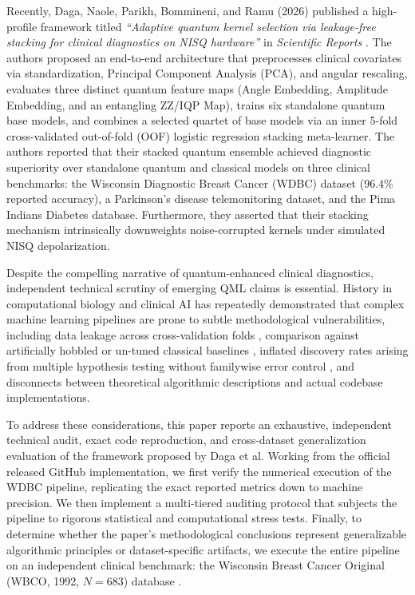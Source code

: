 \documentclass[journal,twocolumn]{IEEEtran}
\begin{document}
Recently, Daga, Naole, Parikh, Bommineni, and Ramu (2026) published a high-profile framework titled \textit{``Adaptive quantum kernel selection via leakage-free stacking for clinical diagnostics on NISQ hardware''} in \textit{Scientific Reports} \cite{daga2026adaptive}. The authors proposed an end-to-end architecture that preprocesses clinical covariates via standardization, Principal Component Analysis (PCA), and angular rescaling, evaluates three distinct quantum feature maps (Angle Embedding, Amplitude Embedding, and an entangling ZZ/IQP Map), trains six standalone quantum base models, and combines a selected quartet of base models via an inner 5-fold cross-validated out-of-fold (OOF) logistic regression stacking meta-learner. The authors reported that their stacked quantum ensemble achieved diagnostic superiority over standalone quantum and classical models on three clinical benchmarks: the Wisconsin Diagnostic Breast Cancer (WDBC) dataset ($96.4\%$ reported accuracy), a Parkinson's disease telemonitoring dataset, and the Pima Indians Diabetes database. Furthermore, they asserted that their stacking mechanism intrinsically downweights noise-corrupted kernels under simulated NISQ depolarization.

Despite the compelling narrative of quantum-enhanced clinical diagnostics, independent technical scrutiny of emerging QML claims is essential. History in computational biology and clinical AI has repeatedly demonstrated that complex machine learning pipelines are prone to subtle methodological vulnerabilities, including data leakage across cross-validation folds \cite{kaufman2012leakage}, comparison against artificially hobbled or un-tuned classical baselines \cite{bouthillier2021accounting}, inflated discovery rates arising from multiple hypothesis testing without familywise error control \cite{dudoit2003multiple}, and disconnects between theoretical algorithmic descriptions and actual codebase implementations.

To address these considerations, this paper reports an exhaustive, independent technical audit, exact code reproduction, and cross-dataset generalization evaluation of the framework proposed by Daga et al. Working from the official released GitHub implementation, we first verify the numerical execution of the WDBC pipeline, replicating the exact reported metrics down to machine precision. We then implement a multi-tiered auditing protocol that subjects the pipeline to rigorous statistical and computational stress tests. Finally, to determine whether the paper's methodological conclusions represent generalizable algorithmic principles or dataset-specific artifacts, we execute the entire pipeline on an independent clinical benchmark: the Wisconsin Breast Cancer Original (WBCO, 1992, $N=683$) database \cite{wolberg1992breast}.
\end{document}
